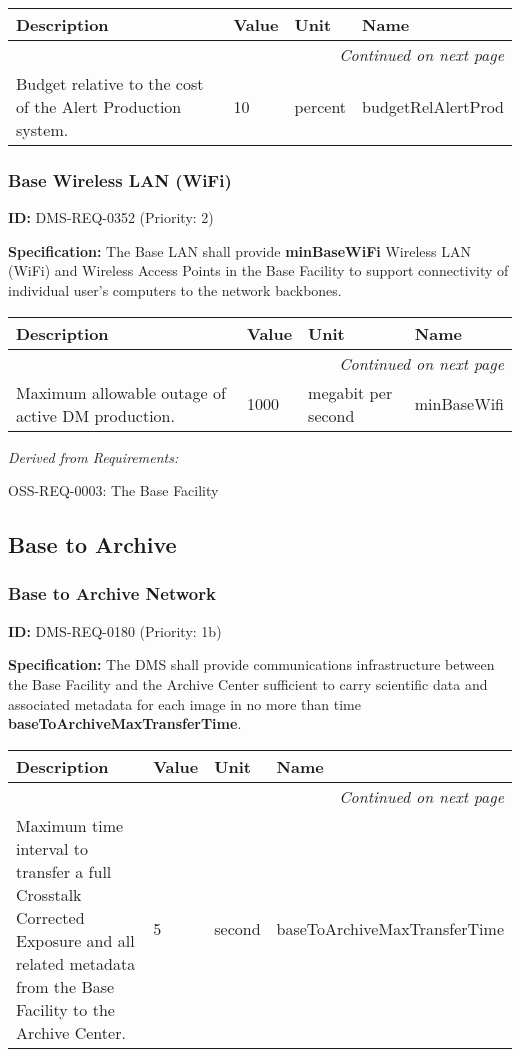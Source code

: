 \documentclass[SE,toc,lsstdraft]{lsstdoc}
\makeatletter
\newcommand{\paramname}[1]{\hspace{0pt}#1}
\newcommand{\unitname}[1]{\hspace{0pt}#1}
\newenvironment{parameters}[0]{%
\setlength\LTleft{0pt}
\setlength\LTright{\fill}
\begin{small}
\begin{longtable}[]{|p{0.49\textwidth}|l|p{0.6in}|p{1.70in}@{}|}

\hline \textbf{Description} & \textbf{Value} & \textbf{Unit} & \textbf{Name} \\ \hline
\endhead

\hline \multicolumn{4}{r}{\emph{Continued on next page}} \\
\endfoot

\hline\hline
\endlastfoot
}{%
\hline
\end{longtable}
\end{small}
}
\makeatother
\begin{document}
\begin{parameters}
Budget relative to the cost of the Alert Production system.
&
10
&
\unitname{%
percent
}
&
\paramname{%
budgetRelAlertProd
} \\\hline
\end{parameters}

\subsubsection{Base Wireless LAN (WiFi)}

\label{DMS-REQ-0352}
\textbf{ID:} DMS-REQ-0352 (Priority: 2)

\textbf{Specification:}
The Base LAN shall provide \textbf{minBaseWiFi} Wireless LAN (WiFi) and Wireless Access Points in the Base Facility to support connectivity of individual user's computers to the network backbones.

\begin{parameters}
Maximum allowable outage of active DM production.
&
1000
&
\unitname{%
megabit per second
}
&
\paramname{%
minBaseWifi
} \\\hline
\end{parameters}

\emph{Derived from Requirements:}

OSS-REQ-0003:
The Base Facility \newline

\subsection{Base to Archive}

\subsubsection{Base to Archive Network}

\label{DMS-REQ-0180}
\textbf{ID:} DMS-REQ-0180 (Priority: 1b)

\textbf{Specification:} The DMS shall provide communications infrastructure between the Base Facility and the Archive Center sufficient to carry scientific data and associated metadata for each image in no more than time \textbf{baseToArchiveMaxTransferTime}.

\begin{parameters}
Maximum time interval to transfer a full Crosstalk Corrected Exposure and all related metadata from the Base Facility to the Archive Center.
&
5
&
\unitname{%
second
}
&
\paramname{%
baseToArchiveMaxTransferTime
} \\\hline
\end{parameters}
\end{document}
